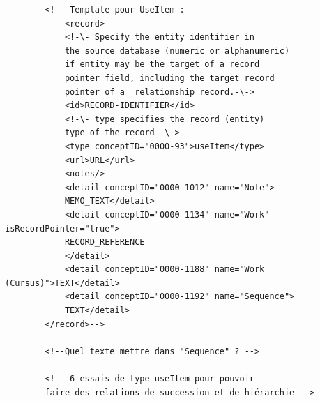 \documentclass[a4paper,12pt,twoside]{book}
\begin{document}
\begin{verbatim}
        <!-- Template pour UseItem :
            <record>
            <!-\- Specify the entity identifier in
            the source database (numeric or alphanumeric)
            if entity may be the target of a record
            pointer field, including the target record 
            pointer of a  relationship record.-\->
            <id>RECORD-IDENTIFIER</id>
            <!-\- type specifies the record (entity) 
            type of the record -\->
            <type conceptID="0000-93">useItem</type>
            <url>URL</url>
            <notes/>
            <detail conceptID="0000-1012" name="Note">
            MEMO_TEXT</detail>
            <detail conceptID="0000-1134" name="Work" isRecordPointer="true">
            RECORD_REFERENCE
            </detail>
            <detail conceptID="0000-1188" name="Work (Cursus)">TEXT</detail>
            <detail conceptID="0000-1192" name="Sequence">
            TEXT</detail>
        </record>-->

        <!--Quel texte mettre dans "Sequence" ? -->

        <!-- 6 essais de type useItem pour pouvoir 
        faire des relations de succession et de hiérarchie -->
        

\end{verbatim}
\end{document}
